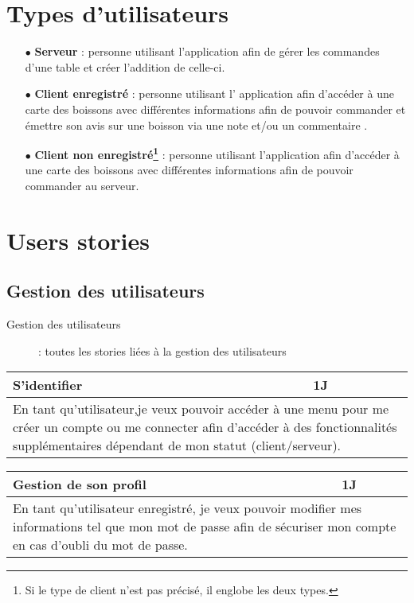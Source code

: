 

\section{Types d'utilisateurs}
\begin{itemize}
	\item[{$\bullet$}] \textbf{Serveur} : personne utilisant l'application
	afin de gérer les commandes d'une table et créer l'addition de celle-ci.
	\item[{$\bullet$}] \textbf{Client enregistré} : personne utilisant l'
	application afin d'accéder à une carte des boissons avec différentes 
	informations afin de pouvoir commander et 
	émettre son avis sur une boisson via une note et/ou un commentaire .
	\item[{$\bullet$}] \textbf{Client non enregistré\footnote{Si le type
	de client n'est pas précisé, il englobe les deux types.}} : personne
	utilisant l'application afin d'accéder à une carte des boissons avec
	différentes informations afin de pouvoir commander au serveur.
\end{itemize}

\section{Users stories}
\subsection{Gestion des utilisateurs}

\begin{description}
	\item[Gestion des utilisateurs] : toutes les stories liées à la gestion des utilisateurs
\end{description}

\begin{center}
	\begin{tabular}{ll}
		\hline
			\multicolumn{1}{|p{14cm}|}{S'identifier} & \multicolumn{1}{p{0.7cm}|}{1J} \\ 
		\hline
			\multicolumn{2}{|p{15cm}|}{En tant qu'utilisateur,je veux pouvoir
			accéder à une menu pour me créer un compte ou me connecter afin d'accéder à des fonctionnalités supplémentaires 
			dépendant de mon statut (client/serveur).} \\
		\hline
	\end{tabular}

	\vspace{1cm}
	
	\begin{tabular}{ll}
		\hline
			\multicolumn{1}{|p{14cm}|}{Gestion de son profil } & \multicolumn{1}{p{0.7cm}|}{1J} \\ 
		\hline
			\multicolumn{2}{|p{15cm}|}{En tant qu'utilisateur enregistré, je veux pouvoir
			modifier mes informations tel que mon mot de passe afin de sécuriser mon compte
			en cas d'oubli du mot de passe.} \\
		\hline
	\end{tabular}
\end{center}

